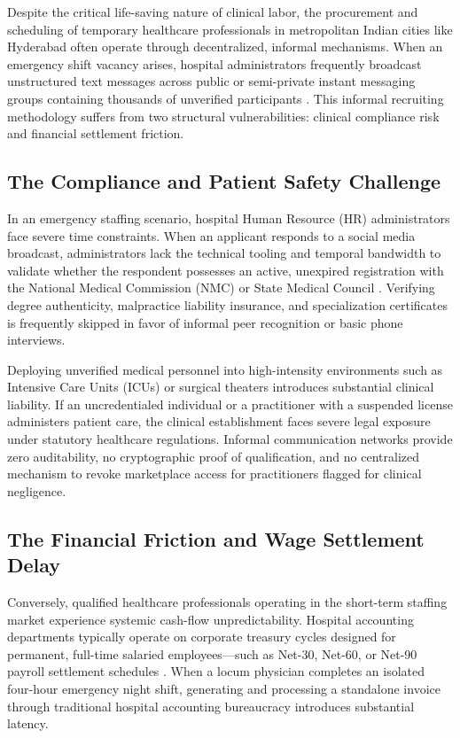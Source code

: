 \documentclass[conference]{IEEEtran}
\begin{document}
Despite the critical life-saving nature of clinical labor, the procurement and scheduling of temporary healthcare professionals in metropolitan Indian cities like Hyderabad often operate through decentralized, informal mechanisms. When an emergency shift vacancy arises, hospital administrators frequently broadcast unstructured text messages across public or semi-private instant messaging groups containing thousands of unverified participants \cite{katz2019rise}. This informal recruiting methodology suffers from two structural vulnerabilities: clinical compliance risk and financial settlement friction.

\subsection{The Compliance and Patient Safety Challenge}
In an emergency staffing scenario, hospital Human Resource (HR) administrators face severe time constraints. When an applicant responds to a social media broadcast, administrators lack the technical tooling and temporal bandwidth to validate whether the respondent possesses an active, unexpired registration with the National Medical Commission (NMC) or State Medical Council \cite{nmc2023act, nmc2023register}. Verifying degree authenticity, malpractice liability insurance, and specialization certificates is frequently skipped in favor of informal peer recognition or basic phone interviews.

Deploying unverified medical personnel into high-intensity environments such as Intensive Care Units (ICUs) or surgical theaters introduces substantial clinical liability. If an uncredentialed individual or a practitioner with a suspended license administers patient care, the clinical establishment faces severe legal exposure under statutory healthcare regulations. Informal communication networks provide zero auditability, no cryptographic proof of qualification, and no centralized mechanism to revoke marketplace access for practitioners flagged for clinical negligence.

\subsection{The Financial Friction and Wage Settlement Delay}
Conversely, qualified healthcare professionals operating in the short-term staffing market experience systemic cash-flow unpredictability. Hospital accounting departments typically operate on corporate treasury cycles designed for permanent, full-time salaried employees---such as Net-30, Net-60, or Net-90 payroll settlement schedules \cite{katz2019rise, einav2016peer}. When a locum physician completes an isolated four-hour emergency night shift, generating and processing a standalone invoice through traditional hospital accounting bureaucracy introduces substantial latency.
\end{document}
